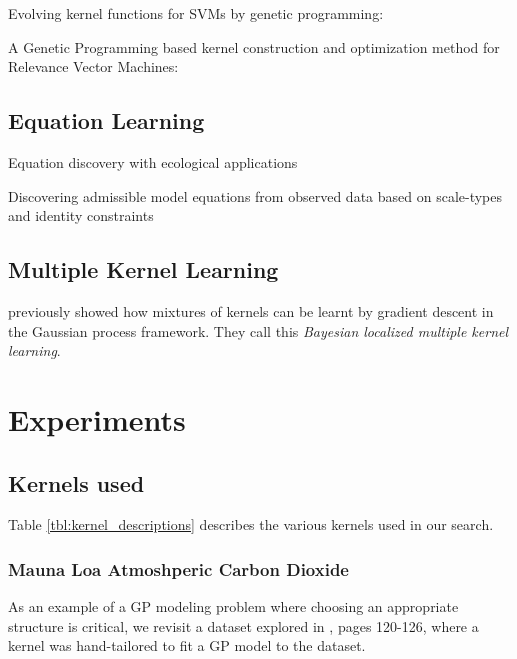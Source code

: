 \documentclass[twoside]{article}
\theoremstyle{definition}
\theoremstyle{remark}
\numberwithin{equation}{section}
\numberwithin{thm}{section}
\begin{document}
Evolving kernel functions for SVMs by genetic programming: \cite{diosan2007evolving}

A Genetic Programming based kernel construction and optimization method for Relevance Vector Machines: \cite{bing2010gp}

\subsection{Equation Learning}

Equation discovery with ecological applications \cite{dzeroski1999equation}

Discovering admissible model equations from observed data based on scale-types and identity constraints \cite{washio1999discovering}

\subsection{Multiple Kernel Learning}

\cite{christoudias2009bayesian} previously showed how mixtures of kernels can be learnt by gradient descent in the Gaussian process framework.  They call this \emph{Bayesian localized multiple kernel learning}.


\section{Experiments}

\subsection{Kernels used}


Table \ref{tbl:kernel_descriptions} describes the various kernels used in our search.



\subsubsection{Mauna Loa Atmoshperic Carbon Dioxide}

As an example of a GP modeling problem where choosing an appropriate structure is critical, we revisit a dataset explored in \cite{rasmussen38gaussian}, pages 120-126, where a kernel was hand-tailored to fit a GP model to the dataset.
\end{document}
